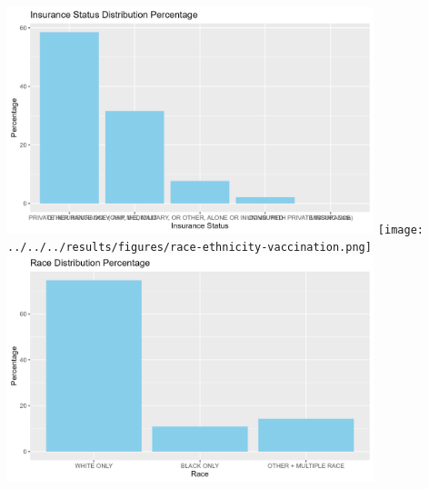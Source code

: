 \documentclass[
  letterpaper,
  DIV=11,
  numbers=noendperiod]{scrartcl}
\begin{document}
\includegraphics[width=0.8\textwidth,height=\textheight]{../../../results/figures/insurance.status.distribution.png}
\texttt{[image: ../../../results/figures/race-ethnicity-vaccination.png]}
\includegraphics[width=0.8\textwidth,height=\textheight]{../../../results/figures/race.distribution.png}
\end{document}
